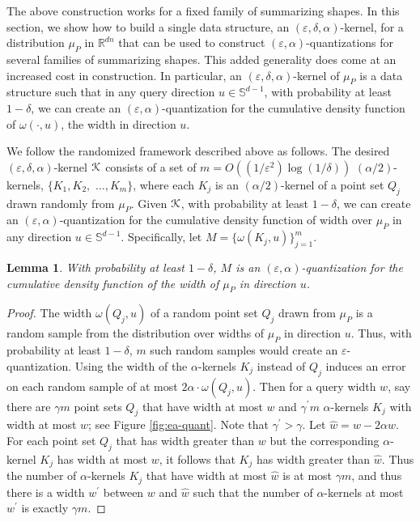 \documentclass{journal}
\newcommand{\eps}{\varepsilon}
\newcommand{\Eu}[1]{\ensuremath{\EuScript{#1}}}
\renewcommand{\b}[1]{\ensuremath{\mathbb{#1}}}
\newcommand{\R}{\ensuremath{\mathbb{R}}}
\newcommand{\wid}{\omega}
\newtheorem {lemma}[theorem]{Lemma}
\begin{document}
The above construction works for a fixed family of summarizing shapes.  In this section, we show how to build a single data structure, an $(\eps, \delta, \alpha)$-kernel, for a distribution $\mu_P$ in $\R^{dn}$ that can be used to construct $(\eps, \alpha)$-quantizations for several families of summarizing shapes. 
This added generality does come at an increased cost in construction.
In particular, an $(\eps, \delta, \alpha)$-kernel of $\mu_P$ is a data structure such that in any query direction $u \in \b{S}^{d-1}$, with probability at least $1-\delta$, we can create an $(\eps, \alpha)$-quantization for the cumulative density function of $\wid(\cdot, u)$, the width in direction $u$.

We follow the randomized framework described above as follows.
The desired $(\eps, \delta, \alpha)$-kernel $\Eu{K}$ consists of a set of $m = O((1/\eps^2) \log (1/\delta))$ $(\alpha/2)$-kernels, $\{K_1, K_2,$ $\ldots, K_m\}$, where each $K_j$ is an $(\alpha/2)$-kernel of a point set $Q_j$ drawn randomly from $\mu_P$.  Given $\Eu{K}$, with probability at least $1-\delta$, we can create an $(\eps, \alpha)$-quantization for the cumulative density function of width over $\mu_P$ in any direction $u \in \b{S}^{d-1}$.
Specifically, let $M = \{\wid(K_j, u) \}_{j=1}^m$.

\begin{lemma}
With probability at least $1-\delta$,
$M$ is an $(\eps, \alpha)$-quantization for the cumulative density function of the width of $\mu_P$ in direction $u$.
\end{lemma}
\begin{proof}
The width $\wid(Q_j, u)$ of a random point set $Q_j$ drawn from $\mu_P$ is a random sample from the distribution over widths of $\mu_P$ in direction $u$.  Thus, with probability at least $1-\delta$, $m$ such random samples would create an $\eps$-quantization.  Using the width of the $\alpha$-kernels $K_j$ instead of $Q_j$ induces an error on each random sample of at most $2\alpha \cdot \wid(Q_j, u)$.
Then for a query width $w$, say there are $\gamma m$ point sets $Q_j$ that have width at most $w$ and $\gamma^\prime m$ $\alpha$-kernels $K_j$ with width at most $w$; see Figure \ref{fig:ea-quant}.
Note that $\gamma^\prime>\gamma$.
Let $\hat{w} = w - 2\alpha w$. For each point set $Q_j$ that has width greater than $w$ but the corresponding $\alpha$-kernel $K_j$ has width at most $w$,
it follows that $K_j$ has width greater than $\hat{w}$.
Thus the number of $\alpha$-kernels $K_j$ that have width at most $\hat{w}$ is at most $\gamma m$, and thus there is a width $w^\prime$ between $w$ and $\hat{w}$ such that the number of $\alpha$-kernels at most $w^\prime$ is exactly $\gamma m$.
\end{proof}
\end{document}
